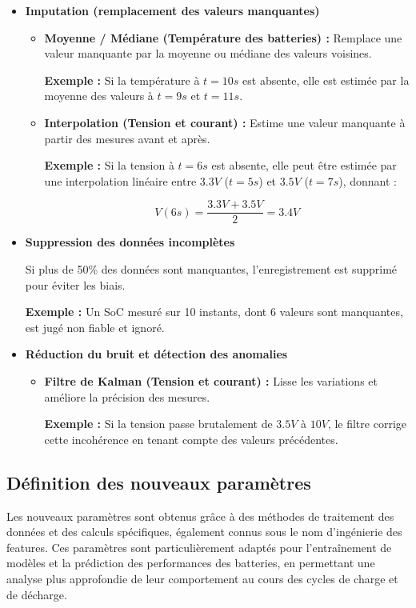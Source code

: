 \begin{itemize}
	\item \textbf{Imputation (remplacement des valeurs manquantes)}
	\begin{itemize}
		\item \textbf{Moyenne / Médiane (Température des batteries) :} Remplace une valeur manquante par la moyenne ou médiane des valeurs voisines.
		
		\textbf{Exemple :} Si la température à $t = 10s$ est absente, elle est estimée par la moyenne des valeurs à $t = 9s$ et $t = 11s$.
		
		\item \textbf{Interpolation (Tension et courant) :} Estime une valeur manquante à partir des mesures avant et après.
		
		\textbf{Exemple :} Si la tension à $t = 6s$ est absente, elle peut être estimée par une interpolation linéaire entre $3.3V$ ($t = 5s$) et $3.5V$ ($t = 7s$), donnant :
		
		\[
		V(6s) = \frac{3.3V + 3.5V}{2} = 3.4V
		\]
	\end{itemize}
	
	\item \textbf{Suppression des données incomplètes}
	
	Si plus de 50\% des données sont manquantes, l’enregistrement est supprimé pour éviter les biais.
	
	\textbf{Exemple :} Un SoC mesuré sur 10 instants, dont 6 valeurs sont manquantes, est jugé non fiable et ignoré.
	
	\item \textbf{Réduction du bruit et détection des anomalies}
	\begin{itemize}
		\item \textbf{Filtre de Kalman (Tension et courant) :} Lisse les variations et améliore la précision des mesures.
		
		\textbf{Exemple :} Si la tension passe brutalement de $3.5V$ à $10V$, le filtre corrige cette incohérence en tenant compte des valeurs précédentes.
	\end{itemize}
\end{itemize}
\subsection{Définition des nouveaux paramètres}
Les nouveaux paramètres sont obtenus grâce à des méthodes de traitement des données et des calculs spécifiques, également connus sous le nom d'ingénierie des features. Ces paramètres sont particulièrement adaptés pour l'entraînement de modèles et la prédiction des performances des batteries, en permettant une analyse plus approfondie de leur comportement au cours des cycles de charge et de décharge.

